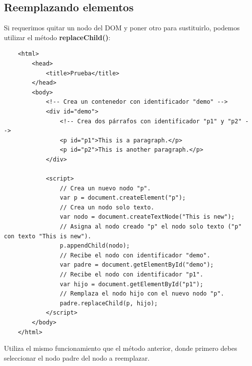 \subsection{Reemplazando elementos}
\hspace{0.55cm}Si requerimos quitar un nodo del DOM y poner otro para sustituirlo, podemos utilizar el método \textbf{replaceChild()}:
\begin{lstlisting}
    <html>
        <head>
            <title>Prueba</title>
        </head>
        <body>
            <!-- Crea un contenedor con identificador "demo" -->
            <div id="demo">
                <!-- Crea dos párrafos con identificador "p1" y "p2" -->
                <p id="p1">This is a paragraph.</p>
                <p id="p2">This is another paragraph.</p>
            </div>
            
            <script>
                // Crea un nuevo nodo "p".
                var p = document.createElement("p");
                // Crea un nodo solo texto.
                var nodo = document.createTextNode("This is new");
                // Asigna al nodo creado "p" el nodo solo texto ("p" con texto "This is new").
                p.appendChild(nodo);
                // Recibe el nodo con identificador "demo".
                var padre = document.getElementById("demo");
                // Recibe el nodo con identificador "p1".
                var hijo = document.getElementById("p1");
                // Remplaza el nodo hijo con el nuevo nodo "p".
                padre.replaceChild(p, hijo);
            </script>
        </body>
    </html>
\end{lstlisting}

Utiliza el mismo funcionamiento que el método anterior, donde primero debes seleccionar el nodo padre del nodo a reemplazar.



